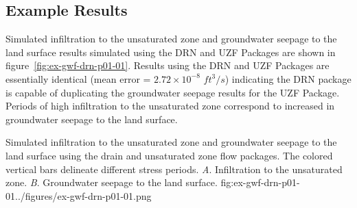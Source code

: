 \subsection{Example Results}

Simulated infiltration to the unsaturated zone and groundwater seepage to the land surface results simulated using the DRN and UZF Packages are shown in figure~\ref{fig:ex-gwf-drn-p01-01}. Results using the DRN and UZF Packages are essentially identical (mean error = $2.72 \times 10^{-8}$ $ft^{3}/s$) indicating the DRN package is capable of duplicating the groundwater seepage results for the UZF Package. Periods of high infiltration to the unsaturated zone correspond to increased in groundwater seepage to the land surface.

\begin{StandardFigure}{
                                     Simulated infiltration to the unsaturated zone and groundwater seepage 
                                     to the land surface using the drain and unsaturated zone flow packages. 
                                     The colored vertical bars delineate different stress periods.
                                     \textit{A}. Infiltration to the unsaturated zone.
                                     \textit{B}. Groundwater seepage to the land surface. 
                                     }{fig:ex-gwf-drn-p01-01}{../figures/ex-gwf-drn-p01-01.png}
\end{StandardFigure}                                 


